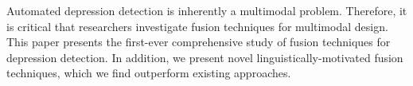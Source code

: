 Automated depression detection is inherently a multimodal problem. Therefore, it is critical that researchers investigate fusion techniques for multimodal design. This paper presents the first-ever comprehensive study of fusion techniques for depression detection. In addition, we present novel linguistically-motivated fusion techniques, which we find outperform existing approaches.
